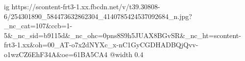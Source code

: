  
 
 
 
 

\ifcmt
  ig https://scontent-frt3-1.xx.fbcdn.net/v/t39.30808-6/254301890_584473632862304_4140785424537092684_n.jpg?_nc_cat=107&ccb=1-5&_nc_sid=b9115d&_nc_ohc=0pns8S9h5JUAX8BGvSR&_nc_ht=scontent-frt3-1.xx&oh=00_AT-o7x2dNYXc_x-nC1GyCGDHADBQjQvv-o1wzCZ6EhF34A&oe=61BA5CA4
  @width 0.4
\fi
